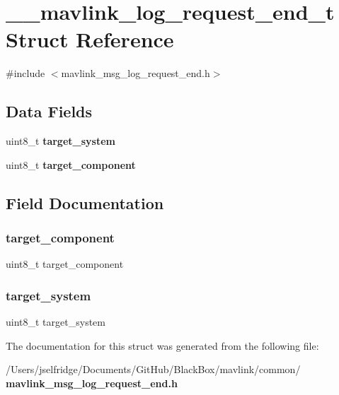 \section{\+\_\+\+\_\+mavlink\+\_\+log\+\_\+request\+\_\+end\+\_\+t Struct Reference}
\label{struct____mavlink__log__request__end__t}


{\ttfamily \#include $<$mavlink\+\_\+msg\+\_\+log\+\_\+request\+\_\+end.\+h$>$}

\subsection*{Data Fields}
\begin{DoxyCompactItemize}
\item 
uint8\+\_\+t \textbf{ target\+\_\+system}
\item 
uint8\+\_\+t \textbf{ target\+\_\+component}
\end{DoxyCompactItemize}


\subsection{Field Documentation}
\mbox{\label{struct____mavlink__log__request__end__t_a1763123cfc5fa7f9c51ec44947d5790f}} 
\subsubsection{target\+\_\+component}
{\footnotesize\ttfamily uint8\+\_\+t target\+\_\+component}

\mbox{\label{struct____mavlink__log__request__end__t_ac9afff43526a157e4c4e45607c1418b8}} 
\subsubsection{target\+\_\+system}
{\footnotesize\ttfamily uint8\+\_\+t target\+\_\+system}



The documentation for this struct was generated from the following file\+:\begin{DoxyCompactItemize}
\item 
/\+Users/jselfridge/\+Documents/\+Git\+Hub/\+Black\+Box/mavlink/common/\textbf{ mavlink\+\_\+msg\+\_\+log\+\_\+request\+\_\+end.\+h}\end{DoxyCompactItemize}
